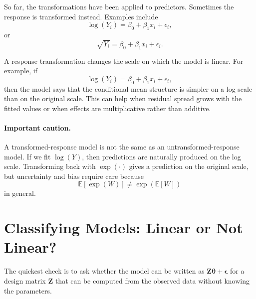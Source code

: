 So far, the transformations have been applied to predictors.  Sometimes the response is transformed instead.  Examples include
\begin{equation}
  \log(Y_i)=\beta_0+\beta_1x_i+\epsilon_i,
\end{equation}
or
\begin{equation}
  \sqrt{Y_i}=\beta_0+\beta_1x_i+\epsilon_i.
\end{equation}

A response transformation changes the scale on which the model is linear.  For example, if
\begin{equation}
  \log(Y_i)=\beta_0+\beta_1x_i+\epsilon_i,
\end{equation}
then the model says that the conditional mean structure is simpler on a log scale than on the original scale.  This can help when residual spread grows with the fitted values or when effects are multiplicative rather than additive.

\paragraph{Important caution.}
A transformed-response model is not the same as an untransformed-response model.  If we fit \(\log(Y)\), then predictions are naturally produced on the log scale.  Transforming back with \(\exp(\cdot)\) gives a prediction on the original scale, but uncertainty and bias require care because
\begin{equation}
  \mathbb{E}[\exp(W)] \ne \exp(\mathbb{E}[W])
\end{equation}
in general.

\section{Classifying Models: Linear or Not Linear?}

The quickest check is to ask whether the model can be written as \(\mathbf{Z}\boldsymbol{\theta}+\boldsymbol{\epsilon}\) for a design matrix \(\mathbf{Z}\) that can be computed from the observed data without knowing the parameters.

